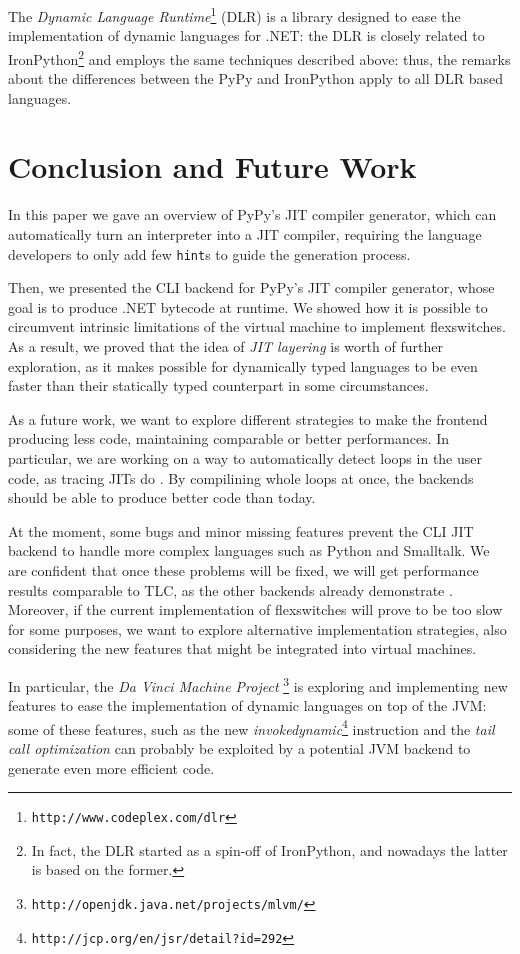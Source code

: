 The \emph{Dynamic Language Runtime}\footnote{\texttt{http://www.codeplex.com/dlr}}
(DLR) is a library designed to ease the implementation of dynamic languages
for .NET: the DLR is closely related to IronPython\footnote{In fact, the DLR
  started as a spin-off of IronPython, and nowadays the latter is based on the
  former.} and employs the same techniques described above: thus, the remarks
about the differences between the PyPy and IronPython apply to all DLR based
languages.


\section{Conclusion and Future Work}

In this paper we gave an overview of PyPy's JIT compiler generator,
which can automatically turn an interpreter into a JIT
compiler, requiring the language developers to only add few \texttt{hint}s to
guide the generation process.

Then, we presented the CLI backend for PyPy's JIT compiler generator, whose
goal is to produce .NET bytecode at runtime.  We showed how it is possible to
circumvent intrinsic limitations of the virtual machine to implement
flexswitches.  As a result, we proved that the idea of \emph{JIT layering} is
worth of further exploration, as it makes possible for dynamically typed
languages to be even faster than their statically typed counterpart in some
circumstances.

As a future work, we want to explore different strategies to make the frontend
producing less code, maintaining comparable or better performances.  In
particular, we are working on a way to automatically detect loops in the user
code, as tracing JITs do \cite{gal_hotpathvm_2006}.  By compilining whole
loops at once, the backends should be able to produce better code than today.

At the moment, some bugs and minor missing features prevent the CLI JIT
backend to handle more complex languages such as Python and Smalltalk.  We are
confident that once these problems will be fixed, we will get performance
results comparable to TLC, as the other backends already demonstrate
\cite{PyPyJIT}.  Moreover, if the current implementation of flexswitches will
prove to be too slow for some purposes, we want to explore alternative
implementation strategies, also considering the new features that might be
integrated into virtual machines.

In particular, the \emph{Da Vinci Machine
  Project} \footnote{\texttt{http://openjdk.java.net/projects/mlvm/}} is exploring and
implementing new features to ease the implementation of dynamic languages on
top of the JVM: some of these features, such as the new
\emph{invokedynamic}\footnote{\texttt{http://jcp.org/en/jsr/detail?id=292}} instruction and the \emph{tail call
  optimization} can probably be exploited by a potential JVM backend to
generate even more efficient code.

